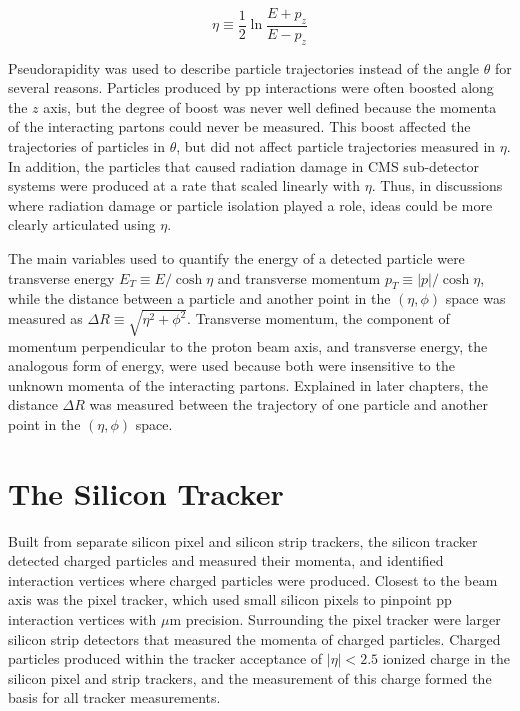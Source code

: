 \begin{equation}
	\eta \equiv \frac{1}{2}\ln{\frac{E+p_{z}}{E-p_{z}}}
\end{equation}

Pseudorapidity was used to describe particle trajectories instead of the angle $\theta$ for several reasons.  Particles 
produced by pp interactions were often boosted along the $z$ axis, but the degree of boost was never well 
defined because the momenta of the interacting partons could never be measured.  This boost affected the 
trajectories of particles in $\theta$, but did not affect particle trajectories measured in $\eta$.  In 
addition, the particles that caused radiation damage in CMS sub-detector systems were produced at 
a rate that scaled linearly with $\eta$.  Thus, in discussions where radiation damage or particle 
isolation played a role, ideas could be more clearly articulated using $\eta$.

The main variables used to quantify the energy of a detected particle were transverse energy 
$E_{T} \equiv E/\cosh{\eta}$ and transverse momentum $p_{T} \equiv |p|/\cosh{\eta}$, while the distance between 
a particle and another point in the $(\eta, \phi)$ space was measured as $\Delta R \equiv \sqrt{\eta^{2} + \phi^{2}}$.  
Transverse momentum, the component of momentum perpendicular to the proton beam axis, and transverse energy, the 
analogous form of energy, were used because both were insensitive to the unknown momenta of the interacting partons.  
Explained in later chapters, the distance $\Delta R$ was measured between the trajectory of one particle 
and another point in the $(\eta, \phi)$ space.

\section{The Silicon Tracker}
\label{sec:siTrackerDescription}
Built from separate silicon pixel and silicon strip trackers, the silicon tracker detected charged particles  
and measured their momenta, and identified interaction vertices where charged particles were produced.  Closest 
to the beam axis was the pixel tracker, which used small silicon pixels to pinpoint pp interaction vertices 
with $\mu$m precision.  Surrounding the pixel tracker were larger silicon strip detectors that measured the 
momenta of charged particles.  Charged particles produced within the tracker acceptance of $|\eta| < 2.5$ ionized 
charge in the silicon pixel and strip trackers, and the measurement of this charge formed the basis for all tracker 
measurements.

